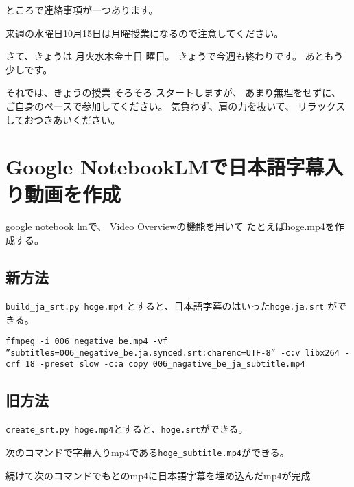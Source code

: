 \documentclass[12pt,jafontscale=0.9247]{jlreq}
\makeatletter
\newcommand{\DOWjpn}{%
	\DTMcomputedayofweekindex{\@dtm@currentyear-\@dtm@currentmonth-\@dtm@currentday}{\DOWindex}%
	\ifcase\DOWindex 月\or 火\or 水\or 木\or 金\or 土\or 日\fi%
}
\makeatother
\begin{document}
{%

ところで連絡事項が一つあります。

来週の水曜日10月15日は月曜授業になるので注意してください。

さて、きょうは\DOWjpn{}曜日。
きょうで今週も終わりです。
あともう少しです。


それでは、きょうの授業
そろそろ
スタートしますが、
あまり無理をせずに、
ご自身のペースで参加してください。
気負わず、肩の力を抜いて、
リラックスしておつきあいください。
}

\newpage
\section*{Google NotebookLMで日本語字幕入り動画を作成}


google notebook lmで、
Video Overviewの機能を用いて
たとえばhoge.mp4を作成する。

\subsection*{新方法}

\verb|build_ja_srt.py hoge.mp4| とすると、日本語字幕のはいった\verb|hoge.ja.srt| ができる。

\begin{verbatim}
ffmpeg -i 006_negative_be.mp4 -vf ”subtitles=006_negative_be.ja.synced.srt:charenc=UTF-8” -c:v libx264 -crf 18 -preset slow -c:a copy 006_nagative_be_ja_subtitle.mp4
\end{verbatim}


\subsection*{旧方法}
\verb|create_srt.py hoge.mp4|とすると、\verb|hoge.srt|ができる。

次のコマンドで字幕入りmp4である\verb|hoge_subtitle.mp4|ができる。

続けて次のコマンドでもとのmp4に日本語字幕を埋め込んだmp4が完成
\end{document}
